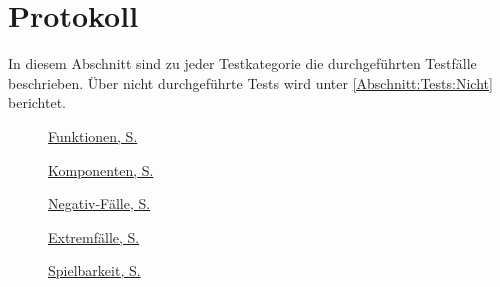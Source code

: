 %



\newpage



\section{Protokoll}
\label{Abschnitt:Tests:Protokoll}

In diesem Abschnitt sind zu jeder Testkategorie die durchgeführten Testfälle beschrieben. Über nicht durchgeführte Tests wird unter \ref*{Abschnitt:Tests:Nicht} berichtet.\\



\begin{description}

	\item[\mousecursor]
	\hyperref[Abschnitt:Tests:Protokoll:Funktion]{Funktionen, S. \pageref{Abschnitt:Tests:Protokoll:Funktion}}
	
	\item[\mousecursor]
	\hyperref[Abschnitt:Tests:Protokoll:Komponenten]{Komponenten, S. \pageref{Abschnitt:Tests:Protokoll:Komponenten}}
	
	\item[\mousecursor]
	\hyperref[Abschnitt:Tests:Protokoll:Negativ]{Negativ-Fälle, S. \pageref{Abschnitt:Tests:Protokoll:Negativ}}
	
	\item[\mousecursor]
	\hyperref[Abschnitt:Tests:Protokoll:Extrem]{Extremfälle, S. \pageref{Abschnitt:Tests:Protokoll:Extrem}}
	
	\item[\mousecursor]
	\hyperref[Abschnitt:Tests:Protokoll:Abnahme]{Spielbarkeit, S. \pageref{Abschnitt:Tests:Protokoll:Abnahme}}
	
\end{description}


